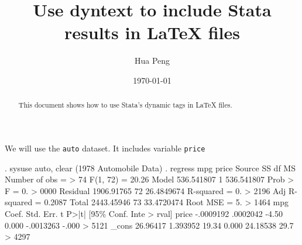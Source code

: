 \documentclass[11pt]{article}
\title{Use dyntext to include Stata results in LaTeX files}
\author{Hua Peng}
\date{\today}
\begin{document}
\maketitle
\begin{abstract}
This document shows how to use Stata's dynamic tags in LaTeX files.  
\end{abstract}


We will use the \texttt{auto} dataset. It includes variable \texttt{price} 

\begin{stlog}[auto]
. sysuse auto, clear
(1978 Automobile Data)
{\smallskip}
. regress mpg price
{\smallskip}
      Source {\VBAR}       SS           df       MS      Number of obs   =      
>   74
   F(1, 72)        =     20.26
       Model {\VBAR}  536.541807         1  536.541807   Prob > F        =    0.
> 0000
    Residual {\VBAR}  1906.91765        72  26.4849674   R-squared       =    0.
> 2196
   Adj R-squared   =    0.2087
       Total {\VBAR}  2443.45946        73  33.4720474   Root MSE        =    5.
> 1464
{\smallskip}
         mpg {\VBAR}      Coef.   Std. Err.      t    P>|t|     [95\% Conf. Inte
> rval]
       price {\VBAR}  -.0009192   .0002042    -4.50   0.000    -.0013263   -.000
> 5121
       _cons {\VBAR}   26.96417   1.393952    19.34   0.000     24.18538    29.7
> 4297

\end{stlog}
\end{document}
